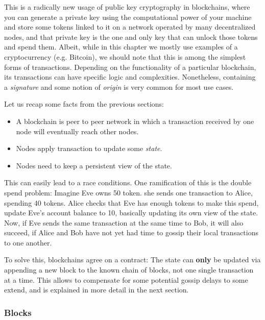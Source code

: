 This is a radically new usage of public key cryptography in blockchains, where you can generate a
private key using the computational power of your machine and store some tokens linked to it on a
network operated by many decentralized nodes, and that private key is the one and only key that can
unlock those tokens and spend them. Albeit, while in this chapter we mostly use examples of a
cryptocurrency (e.g. Bitcoin), we should note that this is among the simplest forms of transactions.
Depending on the functionality of a particular blockchain, its transactions can have specific logic
and complexities. Nonetheless, containing a \textit{signature} and some notion of \textit{origin} is
very common for most use cases.

Let us recap some facts from the previous sections:

\begin{itemize}
	\item A blockchain is peer to peer network in which a transaction received by one node will
	eventually reach other nodes.
	\item Nodes apply transaction to update some \textit{state}.
	\item Nodes need to keep a persistent view of the state.
\end{itemize}

This can easily lead to a race conditions. One ramification of this is the double spend problem:
Imagine Eve owns 50 token. she sends one transaction to Alice, spending 40 tokens. Alice checks that
Eve has enough tokens to make this spend, update Eve's account balance to 10, basically updating its
own view of the state. Now, if Eve sends the same transaction at the same time to Bob, it will also
succeed, if Alice and Bob have not yet had time to gossip their local transactions to one another.

To solve this, blockchains agree on a contract: The state can \textbf{only} be updated via appending
a new block to the known chain of blocks, not one single transaction at a time. This allows to
compensate for some potential gossip delays to some extend, and is explained in more detail in the
next section.

\subsubsection{Blocks} \label{chap_bg:subsec:block}

